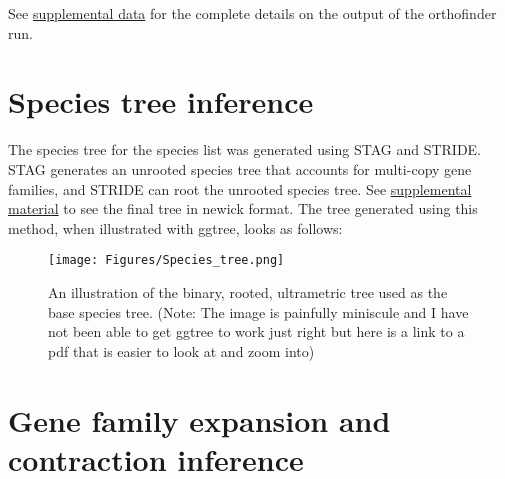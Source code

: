 See \href{https://uah0-my.sharepoint.com/:u:/g/personal/rrd0009_uah_edu/EYwE1_Ily2tEgZk_5hVrbNEBbfiQMsVX4kDM_fsiLFfW1w?e=JTC0gY}{supplemental data} for the complete details on the output of the orthofinder run.

\section{Species tree inference}

The species tree for the species list was generated using STAG and STRIDE. STAG generates an unrooted species tree that accounts for multi-copy gene families, and STRIDE can root the unrooted species tree. See \href{https://uah0-my.sharepoint.com/:t:/g/personal/rrd0009_uah_edu/EZEuafSHfk1OpZBgF09rZcgBoKeu_35QB_noYEs5zCyLQg?e=De2IOj}{supplemental material} to see the final tree in newick format. The tree generated using this method, when illustrated with ggtree, looks as follows:

\begin{figure}[ht]
    \centering
    \texttt{[image: Figures/Species\_tree.png]}
    \caption[An illustration of the binary, rooted, ultrametric tree used as the base species tree.
	(Note: The image is painfully miniscule and I have not been able to get ggtree to work just right but here is a link to a pdf that is easier to look at and zoom into)
	]{An illustration of the binary, rooted, ultrametric tree used as the base species tree.
	(Note: The image is painfully miniscule and I have not been able to get ggtree to work just right but here is a link to a pdf that is easier to look at and zoom into)
	}
    \label{fig 4.1}
\end{figure}

\section{Gene family expansion and contraction inference}

